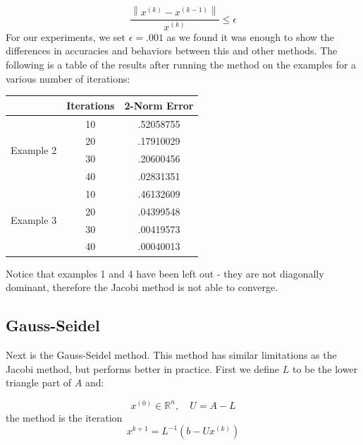 \documentclass[11pt]{article}	%
\newcommand\norm[1]{\left\lVert#1\right\rVert}
\begin{document}
    \begin{equation}
        \frac{\norm{x^{(k)} - x^{(k-1)}}}{x^{(k)}} \leq \epsilon
    \end{equation}
    For our experiments, we set $\epsilon = .001$ as we found it was enough to show the differences in accuracies and behaviors between this and other methods. The following is a table of the results after running the method on the examples for a various number of iterations:
    \begin{center}
     \label{tab:title}
        \begin{tabular}{||c|c|c||}
            \hline
            & Iterations & 2-Norm Error \\ [.35em]
            \hline
            \multirow{4}{5em}{Example 2} & 10 & .52058755 \\ [.25em]
            & 20 & .17910029 \\ [.25em]
            & 30 & .20600456 \\ [.25em]
            & 40 & .02831351 \\ [.25em]
            \hline
            \multirow{4}{5em}{Example 3} & 10 & .46132609 \\ [.25em]
            & 20 & .04399548 \\ [.25em]
            & 30 & .00419573 \\ [.25em]
            & 40 & .00040013 \\ [.25em]
            \hline
        \end{tabular}
    \end{center}

    Notice that examples 1 and 4 have been left out - they are not diagonally dominant, therefore the Jacobi method is not able to converge.

\pagebreak
\subsection{Gauss-Seidel}
Next is the Gauss-Seidel method. This method has similar limitations as the Jacobi method, but performs better in practice.
First we define $L$ to be the lower triangle part of $A$ and:

$$  x^{(0)}\in {\mathbb R}^n, \quad U = A - L $$
the method is the iteration
\begin{equation}\label{eq:jacobi-eq-1}
    x^{k+1} = L^{-1}(b - Ux^{(k)})
\end{equation}
\end{document}
